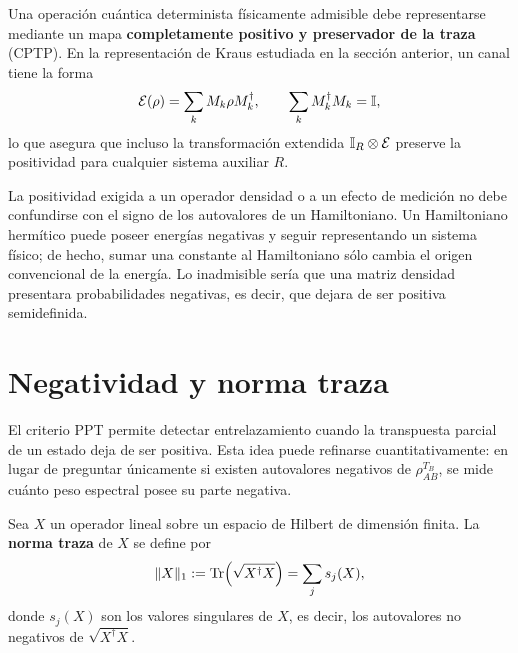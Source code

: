 \documentclass[../main.tex]{subfiles}
\begin{document}
Una operación cuántica determinista físicamente admisible debe representarse mediante un mapa \textbf{completamente positivo y preservador de la traza} (CPTP). En la representación de Kraus estudiada en la sección anterior, un canal tiene la forma
\begin{equation*}
    \mathcal{E}(\rho)
    =\sum_k M_k\rho M_k^{\dagger},
    \qquad
    \sum_k M_k^{\dagger}M_k=\mathbb{I},
\end{equation*}
lo que asegura que incluso la transformación extendida $\mathbb{I}_R\otimes\mathcal{E}$ preserve la positividad para cualquier sistema auxiliar $R$.

\begin{observacion}
La positividad exigida a un operador densidad o a un efecto de medición no debe confundirse con el signo de los autovalores de un Hamiltoniano. Un Hamiltoniano hermítico puede poseer energías negativas y seguir representando un sistema físico; de hecho, sumar una constante al Hamiltoniano sólo cambia el origen convencional de la energía. Lo inadmisible sería que una matriz densidad presentara probabilidades negativas, es decir, que dejara de ser positiva semidefinida.
\end{observacion}


\section{Negatividad y norma traza}\label{subsec:negatividad}

El criterio PPT permite detectar entrelazamiento cuando la transpuesta parcial de un estado deja de ser positiva. Esta idea puede refinarse cuantitativamente: en lugar de preguntar únicamente si existen autovalores negativos de $\rho_{AB}^{T_B}$, se mide cuánto peso espectral posee su parte negativa.

\begin{definicion}
Sea $X$ un operador lineal sobre un espacio de Hilbert de dimensión finita. La \textbf{norma traza} de $X$ se define por
\begin{equation*}
    \|X\|_1
    :=\Tr\!\left(\sqrt{X^{\dagger}X}\right)
    =\sum_j s_j(X),
\end{equation*}
donde $s_j(X)$ son los valores singulares de $X$, es decir, los autovalores no negativos de $\sqrt{X^{\dagger}X}$.
\end{definicion}
\end{document}

